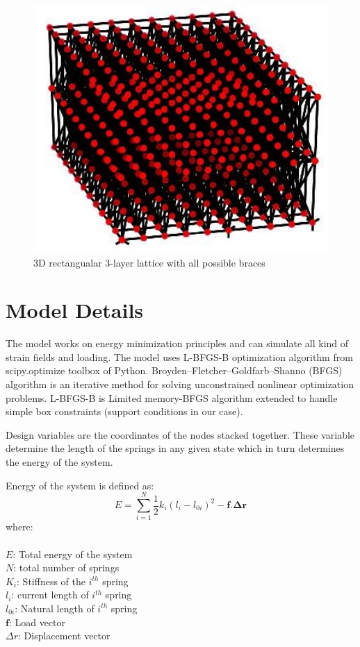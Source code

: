 \begin{figure}[!htbp]
\begin{minipage}{0.3\textwidth}
    \includegraphics[width = 1\textwidth]{Figures/10x12braced3d3layer.jpg}
    \caption{3D rectangualar 3-layer lattice with all possible braces}
    \label{fig:3d_rect3}
\end{minipage}
\end{figure}

\section{Model Details}
The model works on energy minimization principles and can simulate all kind of strain fields and loading. The model uses L-BFGS-B optimization algorithm from scipy.optimize toolbox of Python. Broyden–Fletcher–Goldfarb–Shanno (BFGS) algorithm is an iterative method for solving unconstrained nonlinear optimization problems. L-BFGS-B is Limited memory-BFGS algorithm extended to handle simple box constraints (support conditions in our case). 

Design variables are the coordinates of the nodes stacked together. These variable determine the length of the springs in any given state which in turn determines the energy of the system.

Energy of the system is defined as:
\begin{equation}
    E = \sum_{i = 1}^{N}\frac{1}{2}k_i (l_i - l_{0i})^2 - \boldsymbol{f.\Delta r}
\end{equation}
where:\\
\\
    $E$: Total energy of the system\\
    $N$: total number of springs\\
    $K_i$: Stiffness of the $i^{th}$ spring\\
    $l_i$: current length of $i^{th}$ spring\\
    $l_{0i}$: Natural length of $i^{th}$ spring\\
    $\boldsymbol{f}$: Load vector\\
    $\Delta r$: Displacement vector\\
    
